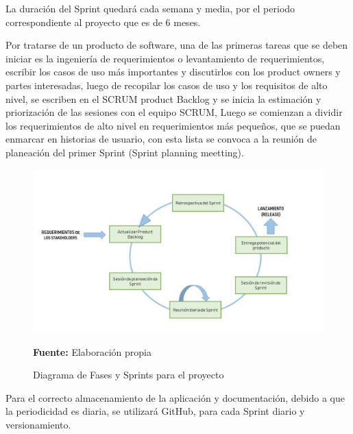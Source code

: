 La duración del Sprint quedará cada semana y media, por el periodo correspondiente al proyecto que es de 6 meses.

Por tratarse de un producto de software, una de las primeras tareas que se deben iniciar es la ingeniería de requerimientos o levantamiento de requerimientos, escribir los casos de uso más importantes y discutirlos con los product owners y  partes interesadas, luego de recopilar los casos de uso y los requisitos de alto nivel, se escriben en el SCRUM product Backlog y se inicia la estimación y priorización de las sesiones con el equipo SCRUM, Luego se comienzan a dividir los requerimientos de alto nivel en requerimientos más pequeños, que se puedan enmarcar en historias de usuario, con esta lista se convoca a la reunión de planeación del primer Sprint (Sprint planning meetting).

\begin{figure}[H]
    \centering
    \includegraphics[width=1\textwidth]{Anexos/LATEX/chapters/images/Scrum_1.jpg}
    \caption{Diagrama de Fases y Sprints para el proyecto}
    \small{\textbf{Fuente:} Elaboración propia}
    \label{SCRUM2}
\end{figure}

Para el correcto almacenamiento de la aplicación y documentación, debido a que la periodicidad es diaria, se utilizará GitHub, para cada Sprint diario y versionamiento.    


 

